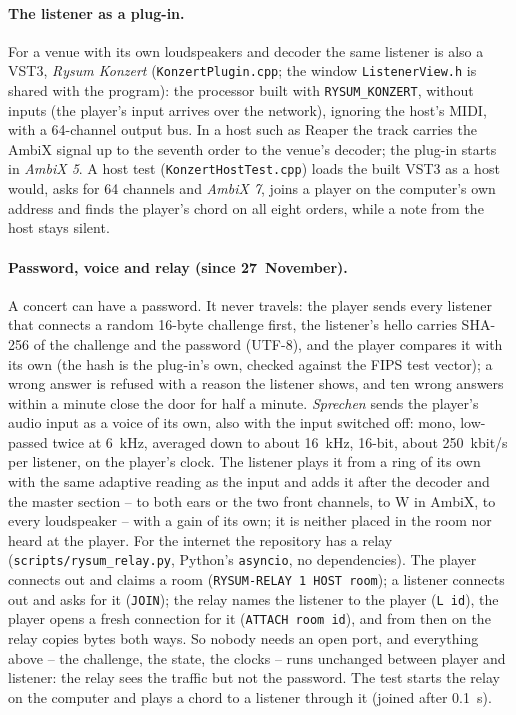 \documentclass[11pt,a4paper,parskip=half,DIV=11,toc=bibliography]{scrartcl}
\newcommand{\ui}[1]{\emph{#1}}                 %
\newcommand{\code}[1]{\texttt{#1}}
\newcommand{\fn}[1]{\mbox{\texttt{#1}}}
\begin{document}
\paragraph{The listener as a plug-in.} For a venue with its own loudspeakers and decoder the same listener is also a VST3,
\emph{Rysum Konzert} (\fn{KonzertPlugin.cpp}; the window \fn{ListenerView.h} is shared with the program): the processor built with
\code{RYSUM\_KONZERT}, without inputs (the player's input arrives over the network), ignoring the host's MIDI, with a
64-channel output bus. In a host such as Reaper the track carries the AmbiX signal up to the seventh order to the venue's decoder;
the plug-in starts in \ui{AmbiX 5}. A host test (\fn{KonzertHostTest.cpp}) loads the built VST3 as a host would, asks for
64 channels and \ui{AmbiX 7}, joins a player on the computer's own address and finds the player's chord on all eight orders,
while a note from the host stays silent.

\paragraph{Password, voice and relay (since 27~November).} A concert can have a password. It never travels: the player sends every listener that connects
a random 16-byte challenge first, the listener's hello carries SHA-256 of the challenge and the password (UTF-8), and the player compares it with its own
(the hash is the plug-in's own, checked against the FIPS test vector); a wrong answer is refused with a reason the listener shows, and ten wrong answers
within a minute close the door for half a minute. \ui{Sprechen} sends the player's audio input as a voice of its own, also with the input switched off:
mono, low-passed twice at \SI{6}{kHz}, averaged down to about \SI{16}{kHz}, 16-bit, about \SI{250}{kbit/s} per listener, on the player's clock. The
listener plays it from a ring of its own with the same adaptive reading as the input and adds it after the decoder and the master section -- to both ears
or the two front channels, to W in AmbiX, to every loudspeaker -- with a gain of its own; it is neither placed in the room nor heard at the player.
For the internet the repository has a relay (\fn{scripts/rysum\_relay.py}, Python's \code{asyncio}, no dependencies). The player connects out and claims a
room (\code{RYSUM-RELAY 1 HOST room}); a listener connects out and asks for it (\code{JOIN}); the relay names the listener to the player (\code{L id}), the
player opens a fresh connection for it (\code{ATTACH room id}), and from then on the relay copies bytes both ways. So nobody needs an open port, and
everything above -- the challenge, the state, the clocks -- runs unchanged between player and listener: the relay sees the traffic but not the
password. The test starts the relay on the computer and plays a chord to a listener through it (joined after \SI{0.1}{s}).
\end{document}
